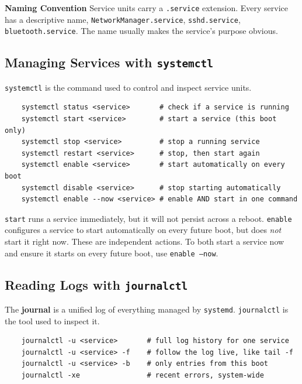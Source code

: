 \documentclass{article}
\newcommand{\code}[1]{\colorbox{codebg}{\texttt{#1}}}
\begin{document}
\begin{callout}{\textbf{Naming Convention}}
	Service units carry a \code{.service} extension. Every service has a
	descriptive name, \code{NetworkManager.service}, \code{sshd.service},
	\code{bluetooth.service}. The name usually makes the service's purpose obvious.
\end{callout}

\subsection{Managing Services with \code{systemctl}}

\code{systemctl} is the command used to control and inspect service units.

\begin{verbatim}
	systemctl status <service>       # check if a service is running
	systemctl start <service>        # start a service (this boot only)
	systemctl stop <service>         # stop a running service
	systemctl restart <service>      # stop, then start again
	systemctl enable <service>       # start automatically on every boot
	systemctl disable <service>      # stop starting automatically
	systemctl enable --now <service> # enable AND start in one command
\end{verbatim}

\begin{tcolorbox}[arc=12pt, outer arc=10pt,
	colback=red!5!white, colframe=red!60!black,
	title=\textbf{Start vs.\ Enable --- Not the Same Thing}]
	\code{start} runs a service immediately, but it will not persist across a
	reboot. \code{enable} configures a service to start automatically on every
	future boot, but does \textit{not} start it right now. These are independent
	actions. To both start a service now and ensure it starts on every future
	boot, use \code{enable --now}.
\end{tcolorbox}

\subsection{Reading Logs with \code{journalctl}}

The \textbf{journal} is a unified log of everything managed by \code{systemd}.
\code{journalctl} is the tool used to inspect it.

\begin{verbatim}
	journalctl -u <service>       # full log history for one service
	journalctl -u <service> -f    # follow the log live, like tail -f
	journalctl -u <service> -b    # only entries from this boot
	journalctl -xe                # recent errors, system-wide
\end{verbatim}
\end{document}
